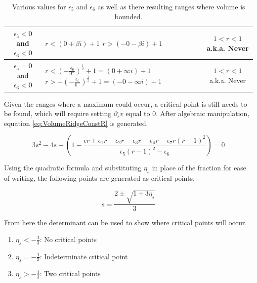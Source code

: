 \begin{table}[h]
\begin{tabular}{c|p{6cm}|c}
        $\epsilon_5<0$ and $\epsilon_6<0$
        &
        $r< (0+\beta i)+1$
        \newline
        $r> (-0-\beta i)+1$
        &
        $1<r<1$ a.k.a. Never
        \\
        \hline
        
        $\epsilon_5=0$ and $\epsilon_6<0$
        &
        $r< \left(-\frac{\epsilon_6}{0^-}\right)^\frac{1}{2}+1=(0+\infty i)+1$
        \newline
        $r> -\left(-\frac{\epsilon_6}{0^-}\right)^\frac{1}{2}+1=(-0-\infty i)+1$
        &
        $1<r<1$ a.k.a. Never
        \\
    \end{tabular}
    \caption{Various values for $\epsilon_5$ and $\epsilon_6$ as well as there resulting ranges where volume is bounded.}
    \label{tab:BoundedVolumeRanges}
\end{table}

Given the ranges where a maximum could occur, a critical point is still needs to be found, which will require setting $\partial_sv$ equal to $0$. After algebraic manipulation, equation \ref{eq:VolumeRidgeConstR} is generated.

\begin{equation}
    \label{eq:VolumeRidgeConstR}
    3s^2-4s+\left( 1-\frac{
    		\epsilon r+
		\epsilon_1 r-
		\epsilon_2 r-
		\epsilon_3 r-
		\epsilon_4 r-
		\epsilon_7 r(r-1)^2		
	}{
		\epsilon_5(r-1)^2-\epsilon_6
	}
    \right)=0
\end{equation}

 Using the quadratic formula and substituting $\eta_s$ in place of the fraction for ease of writing, the following points are generated as critical points.
 
\begin{equation*}
    s=\frac{2\pm \sqrt{1+3\eta_s}}{3}
\end{equation*}

From here the determinant can be used to show where critical points will occur.

\begin{enumerate}
    \item $\eta_s < -\frac{1}{3}$: No critical points
    \item $\eta_s = -\frac{1}{3}$: Indeterminate critical point
    \item $\eta_s > -\frac{1}{3}$: Two critical points
\end{enumerate}

